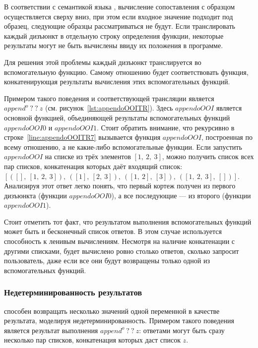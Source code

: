 В соответствии с семантикой языка \haskell{}, вычисление сопоставления с образцом осуществляется сверху вниз, при этом если входное значение подходит под образец, следующие образцы рассматриваться не будут. 
Если транслировать каждый дизъюнкт в отдельную строку определения функции, некоторые результаты могут не быть вычислены ввиду их положения в программе. 

Для решения этой проблемы каждый дизъюнкт транслируется во вспомогательную функцию. 
Самому отношению будет соответствовать функция, конкатенирующая результаты вычисления этих вспомогательных функций.

Примером такого поведения и соответствующей трансляции является $append^o \ ? \ ? \ z$ (см. рисунок~\ref{lst:appendoOOITR}).
Здесь $appendoOOI$ является основной функцией, объединяющей результаты вспомогательных функций $appendoOOI0$ и $appendoOOI1$.
Стоит обратить внимание, что рекурсивно в строке~\ref{line:appendoOOITR7} вызывается функция $appendoOOI$, построенная по всему отношению, а не какие-либо вспомогательные функции.
Если запустить $appendoOOI$ на списке из трёх элементов $[1,~2,~3]$, можно получить список всех пар списков, конкатенация которых даёт входящий список: \\ $[([],~[1,~2,~3]),~([1],~[2,~3]),~([1,~2],~[3]),~([1,~2,~3],~[])]$.
Анализируя этот ответ легко понять, что первый кортеж получен из первого дизъюнкта (функции $appendoOOI0$), а все последующие --- из второго (функции $appendoOOI1$).

Стоит отметить тот факт, что результатом выполнения вспомогательных функций может быть и бесконечный список ответов.
В этом случае используется способность \haskell{} к ленивым вычислениям.
Несмотря на наличие конкатенации с другими списками, будет вычислено ровно столько ответов, сколько запросит пользователь, даже если все они будут возвращены только одной из вспомогательных функций.


\subsubsection{Недетерминированность результатов}
\label{sec:nedeterm}

\miniKanren{} способен возвращать несколько значений одной переменной в качестве результата, моделируя недетерминированность.
Примером такого поведения является результат выполнения $append^o \ ? \ ? \ z$: ответами могут быть сразу несколько пар списков, конкатенация которых даст список $z$.

